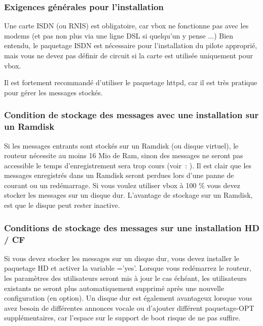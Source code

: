 \subsubsection{Exigences générales pour l'installation}

Une carte ISDN (ou RNIS) est obligatoire, car vbox ne fonctionne pas avec les modems
(et pas non plus via une ligne DSL  si quelqu'un y pense ...) Bien entendu, le paquetage
ISDN est nécessaire pour l'installation du pilote approprié, mais vous ne devez pas définir
de circuit si la carte est utilisée uniquement pour vbox.

Il est fortement recommandé d'utiliser le paquetage httpd, car il est très pratique pour
gérer les messages stockés.


\subsubsection{Condition de stockage des messages avec une installation sur un Ramdisk}

Si les messages entrants sont stockés sur un Ramdisk (ou disque virtuel), le routeur
nécessite au moins 16 Mio de Ram, sinon des messages ne seront pas accessible le temps
d'enregistrement sera trop cours (voir~: ). Il est clair que les messages
enregistrés dans un Ramdisk seront perdues lors d'une panne de courant ou un redémarrage.
Si vous voulez utiliser vbox à 100 \% vous devez stocker les messages sur un disque dur.
L'avantage de stockage sur un Ramdisk, est que le disque peut rester inactive.

\subsubsection{Conditions de stockage des messages sur une installation HD / CF}

Si vous devez stocker les messages sur un disque dur, vous devez installer le paquetage HD
et activer la variable ='yes'. Lorsque vous redémarrez le routeur, les paramètres
des utilisateurs seront mis à jour le cas échéant, les utilisateurs existants ne seront plus
automatiquement supprimé après une nouvelle configuration (en option). Un disque dur est également
avantageux lorsque vous avez besoin de différentes annonces vocale ou d'ajouter différent paquetage-OPT
supplémentaires, car l'espace sur le support de boot risque de ne pas suffire.

